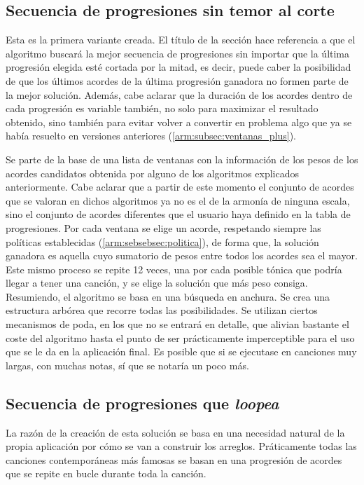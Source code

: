 \subsection{Secuencia de progresiones sin temor al corte}

Esta es la primera variante creada. El título de la sección hace referencia a que el algoritmo buscará la mejor secuencia de progresiones sin importar que la última progresión elegida esté cortada por la mitad, es decir, puede caber la posibilidad de que los últimos acordes de la última progresión ganadora no formen parte de la mejor solución. Además, cabe aclarar que la duración de los acordes dentro de cada progresión es variable también, no solo para maximizar el resultado obtenido, sino también para evitar volver a convertir en problema algo que ya se había resuelto en versiones anteriores  (\ref{arm:subsec:ventanas_plus}).

Se parte de la base de una lista de ventanas con la información de los pesos de los acordes candidatos obtenida por alguno de los algoritmos explicados anteriormente. Cabe aclarar que a partir de este momento el conjunto de acordes que se valoran en dichos algoritmos ya no es el de la armonía de ninguna escala, sino el conjunto de acordes diferentes que el usuario haya definido en la tabla de progresiones. Por cada ventana se elige un acorde, respetando siempre las políticas establecidas (\ref{arm:sebsebsec:politica}), de forma que, la solución ganadora es aquella cuyo sumatorio de pesos entre todos los acordes sea el mayor. Este mismo proceso se repite 12 veces, una por cada posible tónica  que podría llegar a tener una canción, y se elige la solución que más peso consiga. Resumiendo, el algoritmo se basa en una búsqueda en anchura. Se crea una estructura arbórea que recorre todas las posibilidades. Se utilizan ciertos mecanismos de poda, en los que no se entrará en detalle, que alivian bastante el coste del algoritmo hasta el punto de ser prácticamente imperceptible para el uso que se le da en la aplicación final. Es posible que si se ejecutase en canciones muy largas, con muchas notas, sí que se notaría un poco más. 

\subsection{Secuencia de progresiones que \textit{loopea}}

La razón de la creación de esta solución se basa en una necesidad natural de la propia aplicación por cómo se van a construir los arreglos. Práticamente todas las canciones contemporáneas más famosas se basan en una progresión de acordes que se repite en bucle durante toda la canción. 

